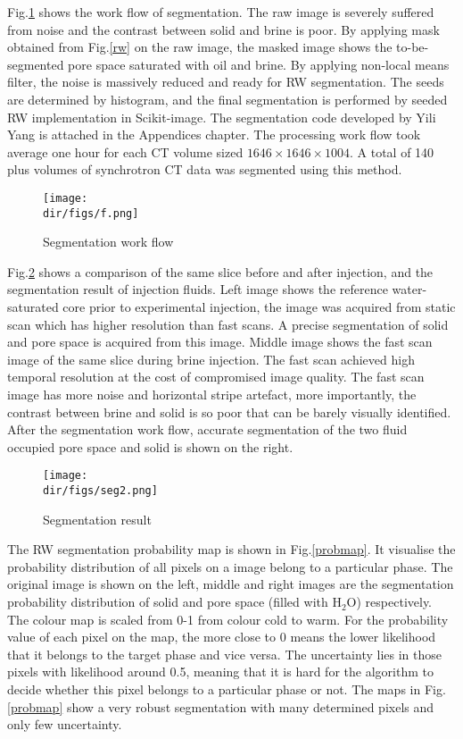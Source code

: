 Fig.\ref{segworkflow} shows the work flow of segmentation. The raw image is severely suffered from noise and the contrast between solid and brine is poor. By applying mask obtained from Fig.\ref{rw} on the raw image, the masked image shows the to-be-segmented pore space saturated with oil and brine. By applying non-local means filter, the noise is massively reduced and ready for RW segmentation. The seeds are determined by histogram, and the final segmentation is performed by seeded RW implementation in Scikit-image. The segmentation code developed by Yili Yang is attached in the Appendices chapter. The processing work flow took average one hour for each CT volume sized $1646 \times 1646 \times 1004$. A total of 140 plus volumes of synchrotron CT data was segmented using this method.

\begin{figure}[htbp]
  \centering
  \texttt{[image: \\dir/figs/f.png]}
  \caption{Segmentation work flow}
  \label{segworkflow}
\end{figure}

Fig.\ref{seg2} shows a comparison of the same slice before and after injection, and the segmentation result of injection fluids. Left image shows the reference water-saturated core prior to experimental injection, the image was acquired from static scan which has higher resolution than fast scans. A precise segmentation of solid and pore space is acquired from this image. Middle image shows the fast scan image of the same slice during brine injection. The fast scan achieved high temporal resolution at the cost of compromised image quality. The fast scan image has more noise and horizontal stripe artefact, more importantly, the contrast between brine and solid is so poor that can be barely visually identified. After the segmentation work flow, accurate segmentation of the two fluid occupied pore space and solid is shown on the right. 

\begin{figure}[htbp]
  \centering
  \texttt{[image: \\dir/figs/seg2.png]}
  \caption{Segmentation result}
  \label{seg2}
\end{figure}

The RW segmentation probability map is shown in Fig.\ref{probmap}. It visualise the probability distribution of all pixels on a image belong to a particular phase. The original image is shown on the left, middle and right images are the segmentation probability distribution of solid and pore space (filled with H$_2$O) respectively.
The colour map is scaled from 0-1 from colour cold to warm. For the probability value of each pixel on the map, the more close to 0 means the lower likelihood that it belongs to the target phase and vice versa. The uncertainty lies in those pixels with likelihood around 0.5, meaning that it is hard for the algorithm to decide whether this pixel belongs to a particular phase or not. The maps in Fig.\ref{probmap} show a very robust segmentation with many determined pixels and only few uncertainty.

